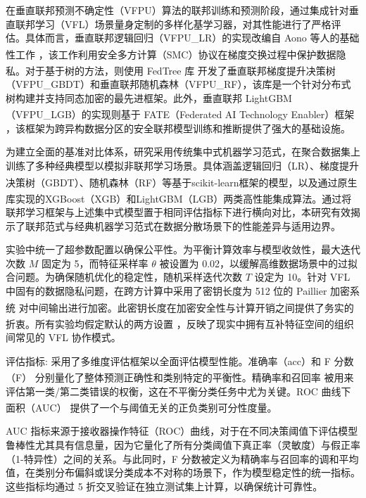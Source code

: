 在垂直联邦预测不确定性（VFPU）算法的联邦训练和预测阶段，通过集成针对垂直联邦学习（VFL）场景量身定制的多样化基学习器，对其性能进行了严格评估。具体而言，垂直联邦逻辑回归（VFPU\_LR）的实现改编自 Aono 等人的基础性工作 \textsuperscript{\cite{aono2016scalable}}，该工作利用安全多方计算（SMC）协议在梯度交换过程中保护数据隐私。对于基于树的方法，则使用 FedTree 库 \textsuperscript{\cite{li2022fedtree}} 开发了垂直联邦梯度提升决策树（VFPU\_GBDT）和垂直联邦随机森林（VFPU\_RF），该库是一个针对分布式树构建并支持同态加密的最先进框架。此外，垂直联邦 LightGBM（VFPU\_LGB）的实现则基于 FATE（Federated AI Technology Enabler）框架 \textsuperscript{\cite{liu2021fate}}，该框架为跨异构数据分区的安全联邦模型训练和推断提供了强大的基础设施。  

为建立全面的基准对比体系，研究采用传统集中式机器学习范式，在聚合数据集上训练了多种经典模型以模拟非联邦学习场景。具体涵盖逻辑回归（LR）、梯度提升决策树（GBDT）、随机森林（RF）等基于scikit-learn框架\textsuperscript{\cite{pedregosa2011scikit}}的模型，以及通过原生库实现的XGBoost（XGB）\textsuperscript{\cite{chen2015xgboost}}和LightGBM（LGB）\textsuperscript{\cite{ke2017lightgbm}}两类高性能集成算法。通过将联邦学习框架与上述集中式模型置于相同评估指标下进行横向对比，本研究有效揭示了联邦范式与经典机器学习范式在数据分散场景下的性能差异与适用边界。


实验中统一了超参数配置以确保公平性。为平衡计算效率与模型收敛性，最大迭代次数 $ M $ 固定为 5，而特征采样率 $ \theta $ 被设置为 0.02，以缓解高维数据场景中的过拟合问题。为确保随机优化的稳定性，随机采样迭代次数 $ T $ 设定为 10。针对 VFL 中固有的数据隐私问题，在跨方计算中采用了密钥长度为 512 位的 Paillier 加密系统 \textsuperscript{\cite{paillier1999public}} 对中间输出进行加密。此密钥长度在加密安全性与计算开销之间提供了务实的折衷。所有实验均假定默认的两方设置 \textsuperscript{\cite{li2022fedtree}}，反映了现实中拥有互补特征空间的组织间常见的 VFL 协作模式。  

评估指标:  
采用了多维度评估框架以全面评估模型性能。准确率（acc）和 F 分数（F）\textsuperscript{\cite{cheng2021secureboost}} 分别量化了整体预测正确性和类别特定的平衡性。精确率和召回率 \textsuperscript{\cite{liu2003building}} 被用来评估第一类/第二类错误的权衡，这在不平衡分类任务中尤为关键。ROC 曲线下面积（AUC）\textsuperscript{\cite{cheng2021secureboost}} 提供了一个与阈值无关的正负类别可分性度量。  

AUC 指标来源于接收器操作特征（ROC）曲线，对于在不同决策阈值下评估模型鲁棒性尤其具有信息量，因为它量化了所有分类阈值下真正率（灵敏度）与假正率（1-特异性）之间的关系。与此同时，F 分数被定义为精确率与召回率的调和平均值，在类别分布偏斜或误分类成本不对称的场景下，作为模型稳定性的统一指标。这些指标均通过 5 折交叉验证在独立测试集上计算，以确保统计可靠性。  
